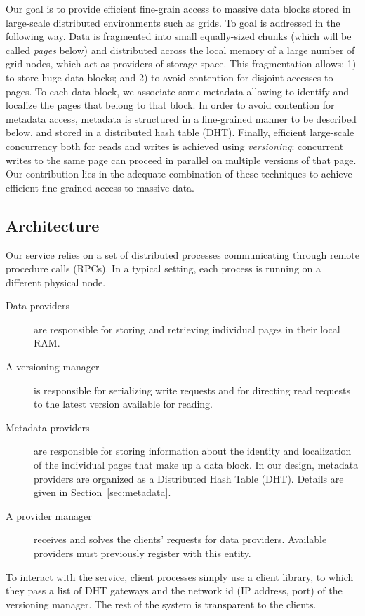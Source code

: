 \documentclass{llncs}
\begin{document}
Our goal is to provide efficient fine-grain access
to massive data blocks stored in large-scale distributed environments
such as grids.
To goal is addressed in the following way. Data is fragmented into
small equally-sized chunks (which will be called \emph{pages} below)
and distributed across the local memory of a large number of grid
nodes, which act as providers of storage space. This fragmentation
allows: 1) to store huge data blocks; and 2) to avoid contention for
disjoint accesses to pages. To each data block, we associate some
metadata allowing to identify and localize the pages that belong to
that block. In order to avoid contention for metadata access, metadata
is structured in a fine-grained manner to be described below, and stored in
a distributed hash table (DHT).  Finally, efficient large-scale
concurrency both for reads and writes is achieved using \emph{versioning}:
concurrent writes to the same page can proceed in parallel on
multiple versions of that page. Our contribution lies in the
adequate combination of these techniques to achieve efficient fine-grained
access to massive data.

\subsection{Architecture}

Our service relies on a set of distributed processes communicating
through remote procedure calls (RPCs).  In a typical setting, each
process is running on a different physical node.
\begin{description}

\item[Data providers] are responsible for storing and retrieving individual
  pages in their local RAM.

\item[A versioning manager] is responsible for serializing write
  requests and for directing read requests to the latest version 
  available for reading.

\item[Metadata providers] are responsible for storing information
  about the identity and localization of the individual pages that
  make up a data block. In our design, metadata providers are
  organized as a Distributed Hash Table (DHT). Details are given in
  Section~\ref{sec:metadata}.

\item[A provider manager] receives and solves the clients' requests
  for data providers. Available providers must previously register
  with this entity. 




\end{description}
To interact with the service, client processes simply use a client
library, to which they pass a list of DHT gateways and the network id (IP
address, port) of the versioning manager. The rest of the system is
transparent to the clients.
\end{document}
